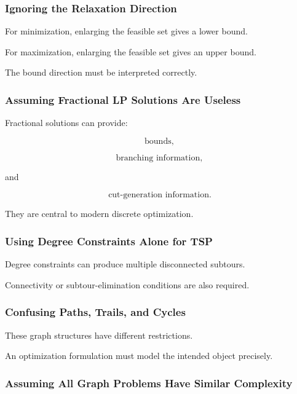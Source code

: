 \subsubsection{Ignoring the Relaxation Direction}

For minimization, enlarging the feasible set gives a lower bound.

For maximization, enlarging the feasible set gives an upper bound.

The bound direction must be interpreted correctly.

\subsubsection{Assuming Fractional LP Solutions Are Useless}

Fractional solutions can provide:

\[
\boxed{
\text{bounds},
}
\]

\[
\boxed{
\text{branching information},
}
\]

and

\[
\boxed{
\text{cut-generation information}.
}
\]

They are central to modern discrete optimization.

\subsubsection{Using Degree Constraints Alone for TSP}

Degree constraints can produce multiple disconnected subtours.

Connectivity or subtour-elimination conditions are also required.

\subsubsection{Confusing Paths, Trails, and Cycles}

These graph structures have different restrictions.

An optimization formulation must model the intended object precisely.

\subsubsection{Assuming All Graph Problems Have Similar Complexity}

